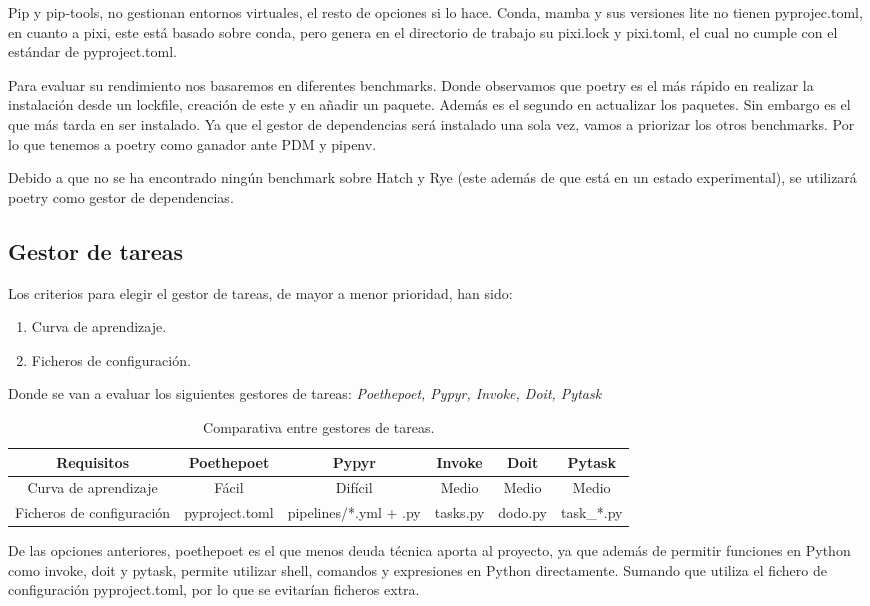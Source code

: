 Pip y pip-tools, no gestionan entornos virtuales, el resto de opciones si lo hace. Conda, mamba y sus versiones lite no tienen pyprojec.toml, en cuanto a pixi, este está basado sobre conda, pero genera en el directorio de trabajo su pixi.lock y pixi.toml, el cual no cumple con el estándar de pyproject.toml.

Para evaluar su rendimiento nos basaremos en diferentes benchmarks\cite{pm-benchmark-shootout}. Donde observamos que poetry es el más rápido en realizar la instalación desde un lockfile, creación de este y en añadir un paquete. Además es el segundo en actualizar los paquetes. Sin embargo es el que más tarda en ser instalado. Ya que el gestor de dependencias será instalado una sola vez, vamos a priorizar los otros benchmarks. Por lo que tenemos a poetry como ganador ante PDM y pipenv.

Debido a que no se ha encontrado ningún benchmark sobre Hatch y Rye (este además de que está en un estado experimental), se utilizará poetry como gestor de dependencias.

\subsection{Gestor de tareas}
Los criterios para elegir el gestor de tareas, de mayor a menor prioridad, han sido:
\begin{enumerate}
    \item Curva de aprendizaje.
    \item Ficheros de configuración.
\end{enumerate}

Donde se van a evaluar los siguientes gestores de tareas: \textit{Poethepoet, Pypyr, Invoke, Doit, Pytask}

\begin{table}[H]
    \centering
    \begin{adjustbox}{width=\textwidth, totalheight=\textheight, keepaspectratio}
        \begin{tabular}{|c|c|c|c|c|c|}
        \hline
        Requisitos & Poethepoet & Pypyr & Invoke & Doit & Pytask\\
        \hline
        Curva de aprendizaje & Fácil & Difícil & Medio & Medio & Medio \\
        Ficheros de configuración & pyproject.toml & pipelines/*.yml + .py & tasks.py & dodo.py & task\_*.py \\
        \hline
        \end{tabular}
    \end{adjustbox}
      \caption{Comparativa entre gestores de tareas.}
\end{table}

De las opciones anteriores, poethepoet es el que menos deuda técnica aporta al proyecto, ya que además de permitir funciones en Python como invoke, doit y pytask, permite utilizar shell, comandos y expresiones en Python directamente. Sumando que utiliza el fichero de configuración pyproject.toml, por lo que se evitarían ficheros extra.


